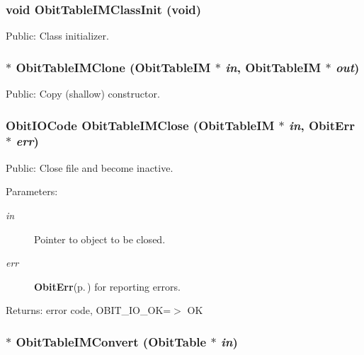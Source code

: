 \subsubsection{\setlength{\rightskip}{0pt plus 5cm}void Obit\-Table\-IMClass\-Init (void)}\label{ObitTableIM_8h_a10}


Public: Class initializer. 

\subsubsection{$\ast$ Obit\-Table\-IMClone ({\bf Obit\-Table\-IM} $\ast$ {\em in}, {\bf Obit\-Table\-IM} $\ast$ {\em out})}\label{ObitTableIM_8h_a15}


Public: Copy (shallow) constructor. 

\subsubsection{\setlength{\rightskip}{0pt plus 5cm}Obit\-IOCode Obit\-Table\-IMClose ({\bf Obit\-Table\-IM} $\ast$ {\em in}, {\bf Obit\-Err} $\ast$ {\em err})}\label{ObitTableIM_8h_a21}


Public: Close file and become inactive. 

\begin{Desc}
\item[Parameters:]
\begin{description}
\item[{\em in}]Pointer to object to be closed. \item[{\em err}]{\bf Obit\-Err}{\rm (p.\,\pageref{structObitErr})} for reporting errors. \end{description}
\end{Desc}
\begin{Desc}
\item[Returns:]error code, OBIT\_\-IO\_\-OK=$>$ OK \end{Desc}
\subsubsection{$\ast$ Obit\-Table\-IMConvert ({\bf Obit\-Table} $\ast$ {\em in})}\label{ObitTableIM_8h_a16}


